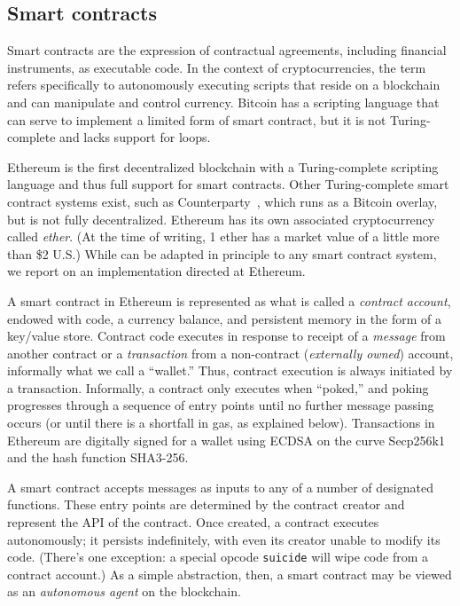 \subsection{Smart contracts}

Smart contracts are the expression of contractual agreements, including financial instruments, as executable code. In the context of cryptocurrencies, the term refers specifically to autonomously executing scripts that reside on a blockchain and can manipulate and control currency. Bitcoin has a scripting language that can serve to implement a limited form of smart contract, but it is not Turing-complete and lacks support for loops. 

Ethereum is the first decentralized blockchain with a Turing-complete scripting language and thus full support for smart contracts. Other Turing-complete smart contract systems exist, such as Counterparty~\cite{}, which runs as a Bitcoin overlay, but is not fully decentralized. Ethereum has its own associated cryptocurrency called \emph{ether}. (At the time of writing, 1 ether has a market value of a little more than \$2 U.S.) While \tc can be adapted in principle to any smart contract system, we report on an implementation directed at Ethereum.

A smart contract in Ethereum is represented as what is called a \emph{contract account}, endowed with code, a currency balance, and persistent memory in the form of a key/value store. Contract code executes in response to receipt of a \emph{message} from another contract or a \emph{transaction} from a non-contract (\emph{externally owned}) account, informally what we call a ``wallet.'' Thus, contract execution is always initiated by a transaction. Informally, a contract only executes when ``poked,'' and poking progresses through a sequence of entry points until no further message passing occurs (or until there is a shortfall in gas, as explained below). Transactions in Ethereum are digitally signed for a wallet using ECDSA on the curve Secp256k1 and the hash function SHA3-256.

A smart contract accepts messages as inputs to any of a number of designated functions. These entry points are determined by the contract creator and represent the API of the contract. Once created, a contract executes autonomously; it persists indefinitely, with even its creator unable to modify its code. (There's one exception: a special opcode \texttt{suicide} will wipe code from a contract account.) As a simple abstraction, then, a smart contract may be viewed as an {\em autonomous agent} on the blockchain. 

